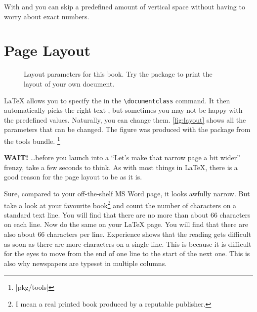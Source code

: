 With  and  you can skip a predefined amount of
vertical space without having to worry about exact numbers.

\section{Page Layout}

\begin{figure}[!hp]
  \begin{center}
    \makeatletter\@mylayout\makeatother
  \end{center}
  \vspace*{1.8cm}
  \caption[Layout parameters for this book.]{Layout parameters for this book. Try the  package to print the layout of your own document.}\label{fig:layout}
\end{figure}

\LaTeX{} allows you to specify the  in the
\verb|\documentclass| command. It then automatically picks the right
text , but sometimes you may not be happy with
the predefined values. Naturally, you can change them.
\thispagestyle{fancyplain}
\autoref{fig:layout} shows all the parameters that can be changed.
The figure was produced with the  package from the tools bundle.%
\footnote{\CTANref|pkg/tools|}

\textbf{WAIT!} \ldots before you launch into a ``Let's make that
narrow page a bit wider'' frenzy, take a few seconds to think. As with
most things in \LaTeX, there is a good reason for the page layout to
be as it is.

Sure, compared to your off-the-shelf MS Word page, it looks awfully
narrow. But take a look at your favourite book\footnote{I mean a real
  printed book produced by a reputable publisher.} and count the number
of characters on a standard text line. You will find that there are no
more than about 66 characters on each line. Now do the same on your
\LaTeX{} page. You will find that there are also about 66 characters
per line.  Experience shows that the reading gets difficult as soon as
there are more characters on a single line. This is because it is
difficult for the eyes to move from the end of one line to the start of the next one.
This is also why newspapers are typeset in multiple columns.

